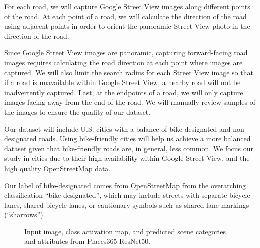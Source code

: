 \documentclass[10pt,twocolumn,letterpaper]{article}
\begin{document}
For each road, we will capture Google Street View images along different points of the road. At each point of a road, we will calculate the direction of the road using adjacent points in order to orient the panoramic Street View photo in the direction of the road. 

Since Google Street View images are panoramic, capturing forward-facing road images requires calculating the road direction at each point where images are captured. We will also limit the search radius for each Street View image so that if a road is unavailable within Google Street View, a nearby road will not be inadvertently captured. Last, at the endpoints of a road, we will only capture images facing away from the end of the road. We will manually review samples of the images to ensure the quality of our dataset.

Our dataset will include U.S. cities with a balance of bike-designated and non-designated roads. Using bike-friendly cities will help us achieve a more balanced dataset given that bike-friendly roads are, in general, less common. We focus our study in cities due to their high availability within Google Street View, and the high quality OpenStreetMap data.

Our label of bike-designated comes from OpenStreetMap from the overarching classification ``bike-designated'', which may include streets with separate bicycle lanes, shared bicycle lanes, or cautionary symbols such as shared-lane markings (``sharrows''). 

\begin{figure}
\begin{center}
   
\end{center}
   \caption{Input image, class activation map, and predicted scene categories and attributes from Places365-ResNet50.}
\label{fig:short}
\end{figure}
\end{document}
